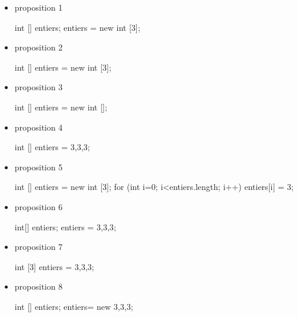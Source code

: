\documentclass[11pt,a4paper]{article}
\begin{document}
            \begin{itemize} 
        
            \item[ \ding{"6F} ] proposition 1
            \par
        \begin{Java}
int [] entiers;
entiers = new int [3];
							\end{Java}
        
            \item[ \ding{"6F} ] proposition 2
            \par
        \begin{Java}
int [] entiers = new int [3]; 
							\end{Java}
        
            \item[ \ding{"6F} ] proposition 3
            \par
        \begin{Java}
int [] entiers = new int [];
							\end{Java}
        
            \item[ \ding{"6F} ] proposition 4
            \par
        \begin{Java}
int [] entiers = {3,3,3};
							\end{Java}
        
            \item[ \ding{"6F} ] proposition 5
            \par
        \begin{Java}
int [] entiers = new int [3];
for (int i=0; i<entiers.length; i++) {
	entiers[i] = 3;
}
							\end{Java}
        
            \item[ \ding{"6F} ] proposition 6
            \par
        \begin{Java}
int[] entiers;
entiers = {3,3,3};
							\end{Java}
        
            \item[ \ding{"6F} ] proposition 7
            \par
        \begin{Java}
int [3] entiers = {3,3,3};
							\end{Java}
        
            \item[ \ding{"6F} ] proposition 8
            \par
        \begin{Java}
int [] entiers;
entiers= new {3,3,3};
							\end{Java}
        
            \end{itemize} 
        
\end{document}
